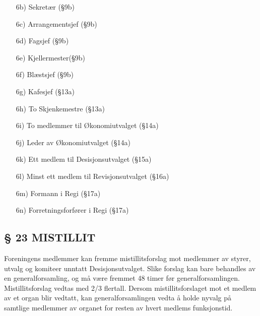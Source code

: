 \begin{itemize}
\begin{itemize}
\begin{itemize}
                \item[6b)] Sekretær (§9b) 

                \item[6c)] Arrangementsjef (§9b) 

                \item[6d)] Fagsjef (§9b) 

                \item[6e)] Kjellermester(§9b) 

                \item[6f)] Blæstsjef (§9b) 

                \item[6g)] Kafesjef (§13a) 

                \item[6h)] To Skjenkemestre (§13a)

                \item[6i)] To medlemmer til Økonomiutvalget (§14a)

                \item[6j)] Leder av Økonomiutvalget (§14a) 

                \item[6k)] Ett medlem til Desisjonsutvalget (§15a) 

                \item[6l)] Minst ett medlem til Revisjonsutvalget (§16a) 

                \item[6m)] Formann i Regi (§17a) 

                \item[6n)] Forretningsforfører i Regi (§17a) 
                \end{itemize}
        \end{itemize}
\end{itemize}


\subsection*{§ 23 MISTILLIT}

Foreningens medlemmer kan fremme mistillitsforslag mot medlemmer av
styrer, utvalg og komiteer unntatt Desisjonsutvalget. Slike forslag
kan bare behandles av en generalforsamling, og må være fremmet 48
timer før generalforsamlingen. Mistillitsforslag vedtas med 2/3
flertall.  Dersom mistillitsforslaget mot et medlem av et organ blir
vedtatt, kan generalforsamlingen vedta å holde nyvalg på samtlige
medlemmer av organet for resten av hvert medlems funksjonstid.



